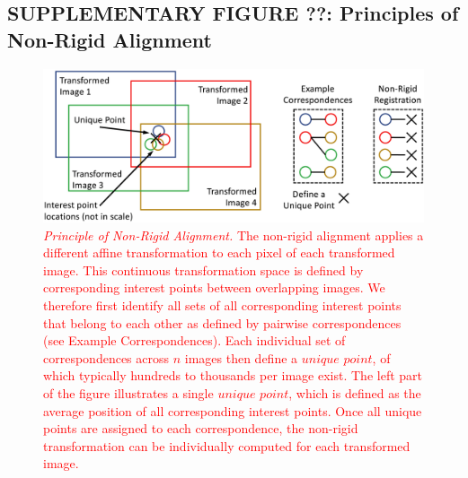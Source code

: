 \documentclass[]{spie}  %
\def\red{\textcolor{red}}
\begin{document}
\subsection*{SUPPLEMENTARY FIGURE ??: Principles of Non-Rigid Alignment}
\vspace{1mm}
\begin{figure}[h!]
\includegraphics[width=\textwidth]{non-rigid.png}
\vspace{-2.0mm}
\caption{\hspace{-0.5mm} \red{\emph{Principle of Non-Rigid Alignment.} The non-rigid alignment applies a different affine transformation to each pixel of each transformed image. This continuous transformation space is defined by corresponding interest points between overlapping images. We therefore first identify all sets of all corresponding interest points that belong to each other as defined by pairwise correspondences (see Example Correspondences). Each individual set of correspondences across $n$ images then define a $unique$ $point$, of which typically hundreds to thousands per image exist. The left part of the figure illustrates a single $unique$ $point$, which is defined as the average position of all corresponding interest points. Once all unique points are assigned to each correspondence, the non-rigid transformation can be individually computed for each transformed image.
}}
\label{fig:non-rigid}
\end{figure}
\end{document}
